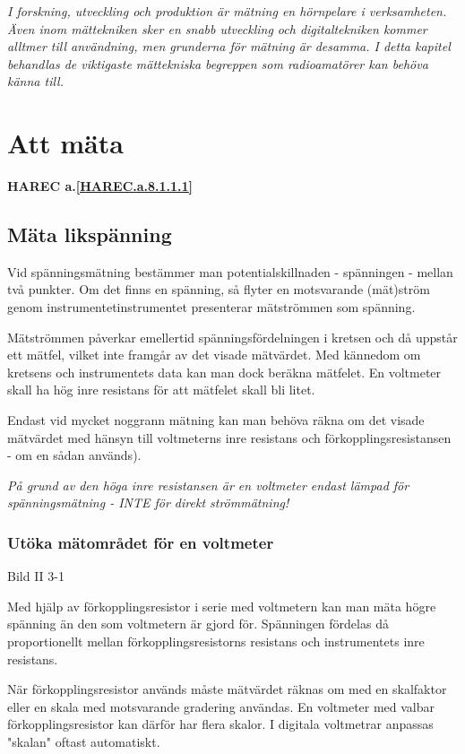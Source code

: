 \emph{I forskning, utveckling och produktion är mätning en hörnpelare
  i verksamheten. Även inom mättekniken sker en snabb utveckling och
  digitaltekniken kommer alltmer till användning, men grunderna för
  mätning är desamma. I detta kapitel behandlas de viktigaste
  mättekniska begreppen som radioamatörer kan behöva känna till.}

\section{Att mäta}
\textbf{
HAREC a.\ref{HAREC.a.8.1.1.1}\label{myHAREC.a.8.1.1.1}
}

\subsection{Mäta likspänning}

Vid spänningsmätning bestämmer man potentialskillnaden - spänningen -
mellan två punkter. Om det finns en spänning, så flyter en motsvarande
(mät)ström genom instrumentetinstrumentet presenterar mätströmmen som
spänning.

Mätströmmen påverkar emellertid spänningsfördelningen i kretsen och då
uppstår ett mätfel, vilket inte framgår av det visade mätvärdet. Med
kännedom om kretsens och instrumentets data kan man dock beräkna
mätfelet. En voltmeter skall ha hög inre resistans för att mätfelet
skall bli litet.

Endast vid mycket noggrann mätning kan man behöva räkna om det visade
mätvärdet med hänsyn till voltmeterns inre resistans och
förkopplingsresistansen - om en sådan används).

\emph{På grund av den höga inre resistansen är en voltmeter endast
  lämpad för spänningsmätning - INTE för direkt strömmätning!}

\subsubsection{Utöka mätområdet för en voltmeter}

Bild II 3-1

Med hjälp av förkopplingsresistor i serie med voltmetern kan man mäta
högre spänning än den som voltmetern är gjord för.  Spänningen
fördelas då proportionellt mellan förkopplingsresistorns resistans och
instrumentets inre resistans.

När förkopplingsresistor används måste mätvärdet räknas om med en
skalfaktor eller en skala med motsvarande gradering användas. En
voltmeter med valbar förkopplingsresistor kan därför har flera
skalor. I digitala voltmetrar anpassas "skalan" oftast automatiskt.

